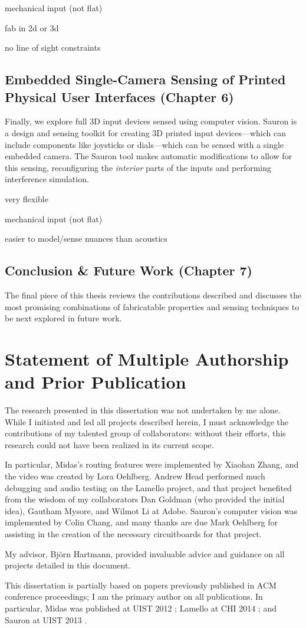 mechanical input (not flat)

fab in 2d or 3d

no line of sight constraints

\subsection{Embedded Single-Camera Sensing of Printed Physical User Interfaces (Chapter 6)}

Finally, we explore full 3D input devices sensed using computer vision. Sauron is a design and sensing toolkit for creating 3D printed input devices---which can include components like joysticks or dials---which can be sensed with a single embedded camera. The Sauron tool makes automatic modifications to allow for this sensing, reconfiguring the \emph{interior} parts of the inputs and performing interference simulation.

very flexible

mechanical input (not flat)

easier to model/sense nuances than acoustics

\subsection{Conclusion \& Future Work (Chapter 7)}

The final piece of this thesis reviews the contributions described and discusses the most promising combinations of fabricatable properties and sensing techniques to be next explored in future work.

\section{Statement of Multiple Authorship and Prior Publication}

The research presented in this dissertation was not undertaken by me alone. While I initiated
and led all projects described herein, I must acknowledge the contributions of my talented group of collaborators: without their efforts, this research could not have been realized in its current scope.

In particular, Midas's routing features were implemented by Xiaohan Zhang, and the video was created by Lora Oehlberg. Andrew Head performed much debugging and audio testing on the Lamello project, and that project benefited from the wisdom of my collaborators Dan Goldman (who provided the initial idea), Gautham Mysore, and Wilmot Li at Adobe. Sauron's computer vision was implemented by Colin Chang, and many thanks are due Mark Oehlberg for assisting in the creation of the necessary circuitboards for that project.

My advisor, Bj\"orn Hartmann, provided invaluable advice and guidance on all projects detailed in this document.

This dissertation is partially based on papers previously published in ACM conference proceedings; I am the primary author on all publications. In particular, Midas was published at UIST 2012 \cite{savage-midas}; Lamello at CHI 2014 \cite{savage-lamello}; and Sauron at UIST 2013 \cite{savage-sauron}.